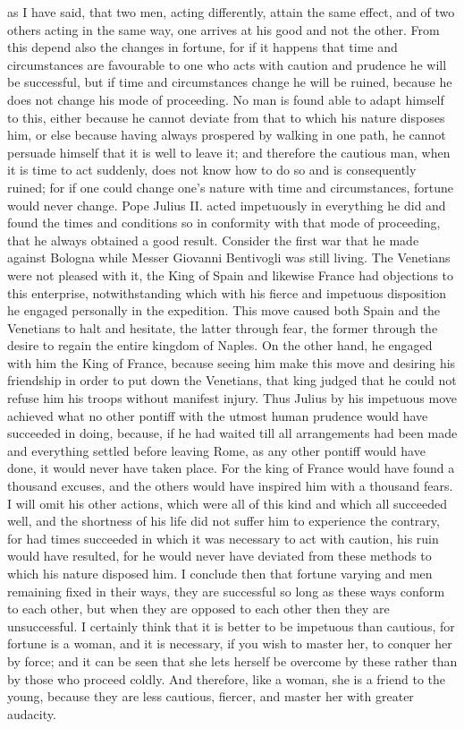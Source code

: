 \documentclass[12pt,letterpaper]{memoir}
\begin{document}
as I have said, that two men, acting differently, attain the same
effect, and of two others acting in the same way, one arrives at his
good and not the other. From this depend also the changes in fortune,
for if it happens that time and circumstances are favourable to one
who acts with caution and prudence he will be successful, but if time
and circumstances change he will be ruined, because he does not change
his mode of proceeding. No man is found able to adapt himself to this,
either because he cannot deviate from that to which his nature disposes
him, or else because having always prospered by walking in one path,
he cannot persuade himself that it is well to leave it; and therefore
the cautious man, when it is time to act suddenly, does not know how
to do so and is consequently ruined; for if one could change one's
nature with time and circumstances, fortune would never change. Pope
Julius II. acted impetuously in everything he did and found the times
and conditions so in conformity with that mode of proceeding, that he
always obtained a good result. Consider the first war that he made
against Bologna while Messer Giovanni Bentivogli was still living. The
Venetians were not pleased with it, the King of Spain and likewise
France had objections to this enterprise, notwithstanding which with
his fierce and impetuous disposition he engaged personally in the
expedition. This move caused both Spain and the Venetians to halt and
hesitate, the latter through fear, the former through the desire to
regain the entire kingdom of Naples. On the other hand, he engaged
with him the King of France, because seeing him make this move and
desiring his friendship in order to put down the Venetians, that king
judged that he could not refuse him his troops without manifest injury.
Thus Julius by his impetuous move achieved what no other pontiff with
the utmost human prudence would have succeeded in doing, because, if
he had waited till all arrangements had been made and everything
settled before leaving Rome, as any other pontiff would have done, it
would never have taken place. For the king of France would have found
a thousand excuses, and the others would have inspired him with a
thousand fears. I will omit his other actions, which were all of this
kind and which all succeeded well, and the shortness of his life did
not suffer him to experience the contrary, for had times succeeded
in which it was necessary to act with caution, his ruin would have
resulted, for he would never have deviated from these methods to which
his nature disposed him. I conclude then that fortune varying and men
remaining fixed in their ways, they are successful so long as these
ways conform to each other, but when they are opposed to each other
then they are unsuccessful. I certainly think that it is better to be
impetuous than cautious, for fortune is a woman, and it is necessary,
if you wish to master her, to conquer her by force; and it can be seen
that she lets herself be overcome by these rather than by those who
proceed coldly. And therefore, like a woman, she is a friend to the
young, because they are less cautious, fiercer, and master her with
greater audacity.
\end{document}
